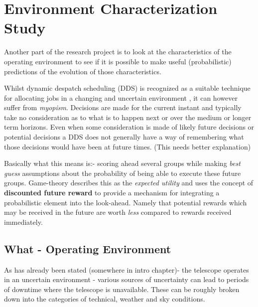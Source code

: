 \section{Environment Characterization Study}
\label{sect:prediction}
Another part of the research project is to look at the characteristics of the operating environment to see if it is possible to make useful (probabilistic) predictions of the evolution of those characteristics.

Whilst dynamic despatch scheduling (DDS) is recognized as a suitable technique for allocating jobs in a changing and uncertain environment \cite{cicirello01random}, it can however suffer from \emph{myopism}. Decisions are made for the current instant and typically take no consideration as to what is to happen next or over the medium or longer term horizons. Even when some consideration is made of likely future decisions or potential decisions a DDS does not generally have a way of remembering what those decisions would have been at future times. (This needs better explanation) 

Basically what this means is:- scoring ahead several groups while making \emph{best guess} assumptions about the probability of being able to execute these future groups. Game-theory describes this as the \emph{expected utility} \cite{vonneumann44games} and uses the concept of {\bf discounted future reward} to provide a mechanism for integrating a probabilistic element into the look-ahead.  Namely that potential rewards which may be received in the future are worth \emph{less} compared to rewards received immediately. 

\subsection{What - Operating Environment}
As has already been stated (somewhere in intro chapter)- the telescope operates in an uncertain environment - various sources of uncertainty can lead to periods of downtime where the telescope is unavailable. These can be roughly broken down into the categories of technical, weather and sky conditions.

